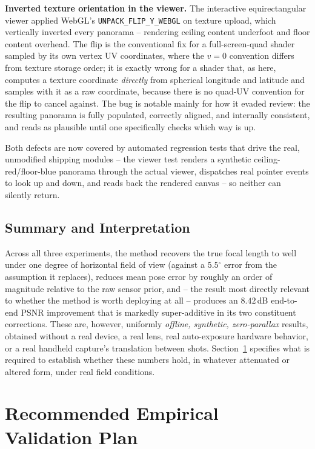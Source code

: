 \documentclass[11pt]{article}
\newcommand{\Deg}{\ensuremath{^{\circ}}}
\begin{document}
\textbf{Inverted texture orientation in the viewer.} The interactive equirectangular viewer applied WebGL's \texttt{UNPACK\_FLIP\_Y\_WEBGL} on texture upload, which vertically inverted every panorama -- rendering ceiling content underfoot and floor content overhead. The flip is the conventional fix for a full-screen-quad shader sampled by its own vertex UV coordinates, where the $v=0$ convention differs from texture storage order; it is exactly wrong for a shader that, as here, computes a texture coordinate \emph{directly} from spherical longitude and latitude and samples with it as a raw coordinate, because there is no quad-UV convention for the flip to cancel against. The bug is notable mainly for how it evaded review: the resulting panorama is fully populated, correctly aligned, and internally consistent, and reads as plausible until one specifically checks which way is up.

Both defects are now covered by automated regression tests that drive the real, unmodified shipping modules -- the viewer test renders a synthetic ceiling-red/floor-blue panorama through the actual viewer, dispatches real pointer events to look up and down, and reads back the rendered canvas -- so neither can silently return.

\subsection{Summary and Interpretation}

Across all three experiments, the method recovers the true focal length to well under one degree of horizontal field of view (against a $5.5\Deg$ error from the assumption it replaces), reduces mean pose error by roughly an order of magnitude relative to the raw sensor prior, and -- the result most directly relevant to whether the method is worth deploying at all -- produces an $8.42$\,dB end-to-end PSNR improvement that is markedly super-additive in its two constituent corrections. These are, however, uniformly \emph{offline, synthetic, zero-parallax} results, obtained without a real device, a real lens, real auto-exposure hardware behavior, or a real handheld capture's translation between shots. Section~\ref{sec:validation} specifies what is required to establish whether these numbers hold, in whatever attenuated or altered form, under real field conditions.

\section{Recommended Empirical Validation Plan}
\label{sec:validation}
\end{document}
